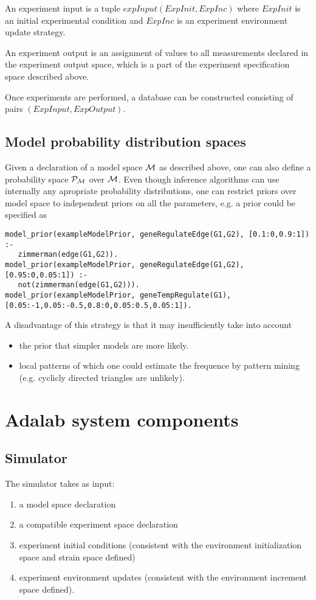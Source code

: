 \documentclass{article}
\begin{document}
An experiment input is a tuple $expInput(ExpInit,ExpInc)$
where $ExpInit$ is an initial experimental condition
and $ExpInc$ is an experiment environment update strategy.

An experiment output is an assignment of values to all measurements declared in the experiment output space, which is a part of the experiment specification space described above.

Once experiments are performed, a database can be constructed consisting of
pairs $(ExpInput,ExpOutput)$.

\subsection{Model probability distribution spaces}
\label{sec:modProbDist}
Given a declaration of a model space $\mathcal{M}$ as described above, one can also define a probability space $\mathcal{P}_\mathcal{M}$ over $\mathcal{M}$.
Even though inference algorithms can use internally any apropriate
probability distributions, one can restrict priors over model space
to independent priors on all the parameters, e.g. a prior could be specified as

\begin{verbatim}
model_prior(exampleModelPrior, geneRegulateEdge(G1,G2), [0.1:0,0.9:1]) :- 
   zimmerman(edge(G1,G2)).
model_prior(exampleModelPrior, geneRegulateEdge(G1,G2), [0.95:0,0.05:1]) :- 
   not(zimmerman(edge(G1,G2))).
model_prior(exampleModelPrior, geneTempRegulate(G1), [0.05:-1,0.05:-0.5,0.8:0,0.05:0.5,0.05:1]).
\end{verbatim}

A disadvantage of this strategy is that it may insufficiently take into account
\begin{itemize}
\item the prior that simpler models are more likely.
\item local patterns of which one could estimate the frequence by pattern mining (e.g. cyclicly directed triangles are unlikely).
\end{itemize}

\section{Adalab system components}

\subsection{Simulator}
The simulator takes as input:
\begin{enumerate}
\item a model space declaration
\item a compatible experiment space declaration
\item experiment initial conditions (consistent with the environment initialization space and strain space defined)
\item experiment environment updates (consistent with the environment increment space defined).
\end{enumerate}
\end{document}
